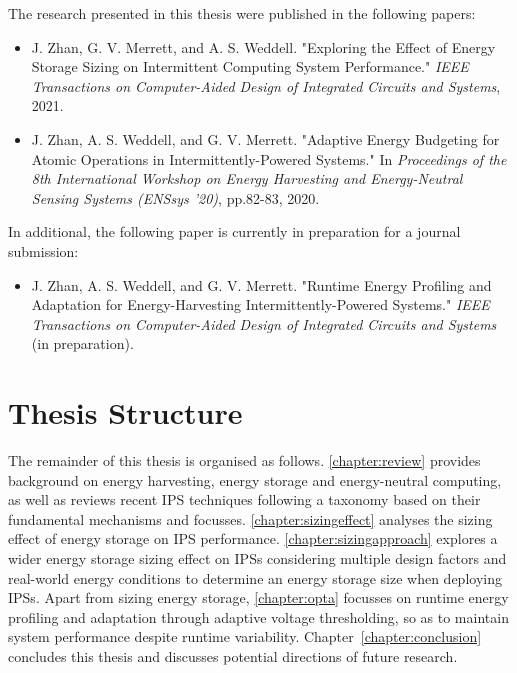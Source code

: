 The research presented in this thesis were published in the following papers:

\begin{itemize}
    \item J. Zhan, G. V. Merrett, and A. S. Weddell. "Exploring the Effect of Energy Storage Sizing on Intermittent Computing System Performance." \textit{IEEE Transactions on Computer-Aided Design of Integrated Circuits and Systems}, 2021.~\cite{zhan2021exploring}

    \item J. Zhan, A. S. Weddell, and G. V. Merrett. "Adaptive Energy Budgeting for Atomic Operations in Intermittently-Powered Systems." In \textit{Proceedings of the 8th International Workshop on Energy Harvesting and Energy-Neutral Sensing Systems (ENSsys '20)}, pp.82-83, 2020.~\cite{zhan2020adaptive}
\end{itemize}

In additional, the following paper is currently in preparation for a journal submission:

\begin{itemize}
    \item J. Zhan, A. S. Weddell, and G. V. Merrett. "Runtime Energy Profiling and Adaptation for Energy-Harvesting Intermittently-Powered Systems." \textit{IEEE Transactions on Computer-Aided Design of Integrated Circuits and Systems} (in preparation).
\end{itemize}


\section{Thesis Structure}

The remainder of this thesis is organised as follows. 
\cref{chapter:review} provides background on energy harvesting, energy storage and energy-neutral computing, as well as reviews recent IPS techniques following a taxonomy based on their fundamental mechanisms and focusses.
\cref{chapter:sizingeffect} analyses the sizing effect of energy storage on IPS performance.
\cref{chapter:sizingapproach} explores a wider energy storage sizing effect on IPSs considering multiple design factors and real-world energy conditions to determine an energy storage size when deploying IPSs. 
Apart from sizing energy storage, \cref{chapter:opta} focusses on runtime energy profiling and adaptation through adaptive voltage thresholding, so as to maintain system performance despite runtime variability.
Chapter~\ref{chapter:conclusion} concludes this thesis and discusses potential directions of future research. 
